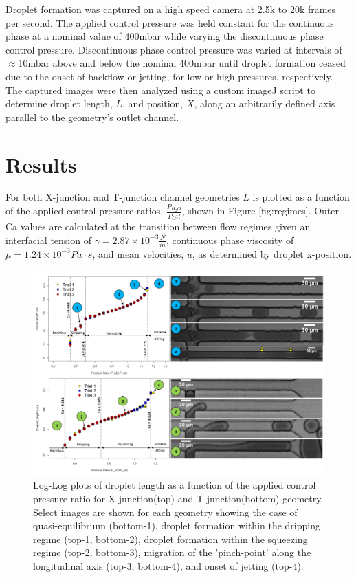 Droplet formation was captured on a high speed camera at 2.5k to 20k frames per second. The applied control pressure was held constant for the continuous phase at a nominal value of 400mbar while varying the discontinuous phase control pressure. Discontinuous phase control pressure was varied at intervals of $\approx$10mbar above and below the nominal 400mbar until droplet formation ceased due to the onset of backflow or jetting, for low or high pressures, respectively. The captured images were then analyzed using a custom imageJ script to determine droplet length, $L$, and position, $X$, along an arbitrarily defined axis parallel to the geometry's outlet channel.
 
\section{Results}

For both X-junction and T-junction channel geometries $L$ is plotted as a function of the applied control pressure ratios, $\frac{P_{H_2O}}{P_Oil}$, shown in Figure \vref{fig:regimes}. Outer Ca values are calculated at the transition between flow regimes given an interfacial tension of $\gamma = 2.87 \times 10^{-3}\frac{N}{m}$, continuous phase viscosity of $\mu = 1.24 \times 10^{-3} Pa \cdot s$, and mean velocities, $u$, as determined by droplet x-position.

\begin{figure}
\centering 
\includegraphics[width=01.0\columnwidth]{regimes.PNG} 
\caption[Droplet Length as a Function of Applied Control Pressure Ratio]{Log-Log plots of droplet length as a function of the applied control pressure ratio for X-junction(top) and T-junction(bottom) geometry. Select images are shown for each geometry showing the case of quasi-equilibrium (bottom-1), droplet formation within the dripping regime (top-1, bottom-2), droplet formation within the squeezing regime (top-2, bottom-3), migration of the 'pinch-point' along the longitudinal axis (top-3, bottom-4), and onset of jetting (top-4).} 
\label{fig:regimes} 
\end{figure}



